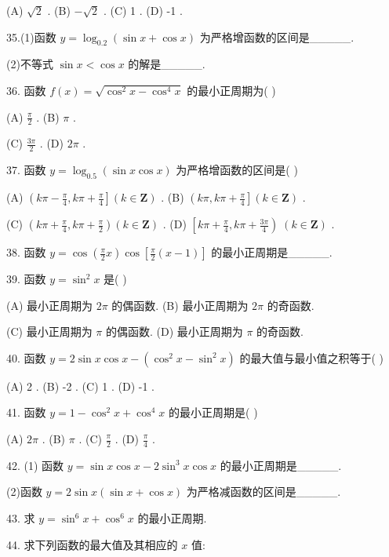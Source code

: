 \documentclass[10pt]{article}
\begin{document}
(A) \(\sqrt{2}\) . (B) \(- \sqrt{2}\) . (C) 1 . (D) -1 .

35.(1)函数 \(y = {\log }_{0.2}\left( {\sin x + \cos x}\right)\) 为严格增函数的区间是\_\_\_\_\_.

(2)不等式 \(\sin x < \cos x\) 的解是\_\_\_\_\_.

36. 函数 \(f\left( x\right)  = \sqrt{{\cos }^{2}x - {\cos }^{4}x}\) 的最小正周期为( )

(A) \(\frac{\pi }{2}\) . (B) \(\pi\) .

(C) \(\frac{3\pi }{2}\) . (D) \({2\pi }\) .

37. 函数 \(y = {\log }_{0.5}\left( {\sin x\cos x}\right)\) 为严格增函数的区间是( )

(A) \(\left( {{k\pi } - \frac{\pi }{4},{k\pi } + \frac{\pi }{4}}\right\rbrack  \left( {k \in  \mathbf{Z}}\right)\) . (B) \(\left( {{k\pi },{k\pi } + \frac{\pi }{4}}\right\rbrack  \left( {k \in  \mathbf{Z}}\right)\) .

(C) \(\left( {{k\pi } + \frac{\pi }{4},{k\pi } + \frac{\pi }{2}}\right) \left( {k \in  \mathbf{Z}}\right)\) . (D) \(\left\lbrack  {{k\pi } + \frac{\pi }{4},{k\pi } + \frac{3\pi }{4}}\right) \;\left( {k \in  \mathbf{Z}}\right)\) .

38. 函数 \(y = \cos \left( {\frac{\pi }{2}x}\right) \cos \left\lbrack  {\frac{\pi }{2}\left( {x - 1}\right) }\right\rbrack\) 的最小正周期是\_\_\_\_\_.

39. 函数 \(y = {\sin }^{2}x\) 是( )

(A) 最小正周期为 \({2\pi }\) 的偶函数. (B) 最小正周期为 \({2\pi }\) 的奇函数.

(C) 最小正周期为 \(\pi\) 的偶函数. (D) 最小正周期为 \(\pi\) 的奇函数.

40. 函数 \(y = 2\sin x\cos x - \left( {{\cos }^{2}x - {\sin }^{2}x}\right)\) 的最大值与最小值之积等于( )

(A) 2 . (B) -2 . (C) 1 . (D) -1 .

41. 函数 \(y = 1 - {\cos }^{2}x + {\cos }^{4}x\) 的最小正周期是( )

(A) \({2\pi }\) . (B) \(\pi\) . (C) \(\frac{\pi }{2}\) . (D) \(\frac{\pi }{4}\) .

42. (1) 函数 \(y = \sin x\cos x - 2{\sin }^{3}x\cos x\) 的最小正周期是\_\_\_\_\_.

(2)函数 \(y = 2\sin x\left( {\sin x + \cos x}\right)\) 为严格减函数的区间是\_\_\_\_\_.

43. 求 \(y = {\sin }^{6}x + {\cos }^{6}x\) 的最小正周期.

44. 求下列函数的最大值及其相应的 \(x\) 值:
\end{document}
